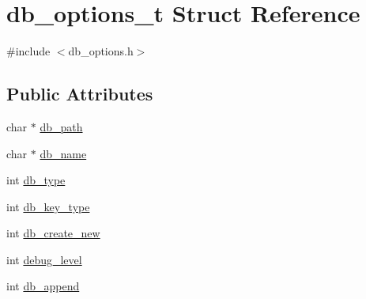 \hypertarget{structdb__options__t}{\section{db\-\_\-options\-\_\-t Struct Reference}
\label{d2/dbc/structdb__options__t}
}


{\ttfamily \#include $<$db\-\_\-options.\-h$>$}

\subsection*{Public Attributes}
\begin{DoxyCompactItemize}
\item 
char $\ast$ \hyperlink{structdb__options__t_a419cca85c72e1fcafb80864cfb3920eb}{db\-\_\-path}
\item 
char $\ast$ \hyperlink{structdb__options__t_ae6a771980c715a452215f1c558a64746}{db\-\_\-name}
\item 
int \hyperlink{structdb__options__t_a456a3e579029a0b71e7bfc33daa38d08}{db\-\_\-type}
\item 
int \hyperlink{structdb__options__t_ad53f43828cf7ca2f7332d2ee3b8b08d9}{db\-\_\-key\-\_\-type}
\item 
int \hyperlink{structdb__options__t_a622ce8f8e8be4e88499e3f8d7b4ac35f}{db\-\_\-create\-\_\-new}
\item 
int \hyperlink{structdb__options__t_a35aba110fe5576aedd07c3260df94893}{debug\-\_\-level}
\item 
int \hyperlink{structdb__options__t_a8a45de9d1573c80092cc5c09205114bf}{db\-\_\-append}
\end{DoxyCompactItemize}


